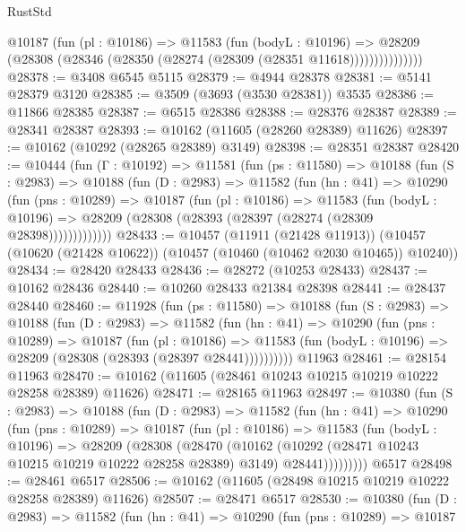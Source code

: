 \begin{lexlean}{RustStd}
\begin{coremodule}
                @10187
                  (fun (pl : @10186) =>
                  @11583
                    (fun (bodyL : @10196) =>
                    @28209 (@28308 (@28346 (@28350 (@28274 (@28309 (@28351 @11618)))))))))))))))
@28378 := @3408 @6545 @5115
@28379 := @4944 @28378
@28381 := @5141 @28379 @3120
@28385 := @3509 (@3693 (@3530 @28381)) @3535
@28386 := @11866 @28385
@28387 := @6515 @28386
@28388 := @28376 @28387
@28389 := @28341 @28387
@28393 := @10162 (@11605 (@28260 @28389) @11626)
@28397 := @10162 (@10292 (@28265 @28389) @3149)
@28398 := @28351 @28387
@28420 := @10444
    (fun (Γ : @10192) =>
    @11581
      (fun (ps : @11580) =>
      @10188
        (fun (S : @2983) =>
        @10188
          (fun (D : @2983) =>
          @11582
            (fun (hn : @41) =>
            @10290
              (fun (pns : @10289) =>
              @10187
                (fun (pl : @10186) =>
                @11583
                  (fun (bodyL : @10196) =>
                  @28209 (@28308 (@28393 (@28397 (@28274 (@28309 @28398)))))))))))))
@28433 := @10457
    (@11911 (@21428 @11913))
    (@10457 (@10620 (@21428 @10622)) (@10457 (@10460 (@10462 @2030 @10465)) @10240))
@28434 := @28420 @28433
@28436 := @28272 (@10253 @28433)
@28437 := @10162 @28436
@28440 := @10260 @28433 @21384 @28398
@28441 := @28437 @28440
@28460 := @11928
    (fun (ps : @11580) =>
    @10188
      (fun (S : @2983) =>
      @10188
        (fun (D : @2983) =>
        @11582
          (fun (hn : @41) =>
          @10290
            (fun (pns : @10289) =>
            @10187
              (fun (pl : @10186) =>
              @11583 (fun (bodyL : @10196) => @28209 (@28308 (@28393 (@28397 @28441))))))))))
    @11963
@28461 := @28154 @11963
@28470 := @10162 (@11605 (@28461 @10243 @10215 @10219 @10222 @28258 @28389) @11626)
@28471 := @28165 @11963
@28497 := @10380
    (fun (S : @2983) =>
    @10188
      (fun (D : @2983) =>
      @11582
        (fun (hn : @41) =>
        @10290
          (fun (pns : @10289) =>
          @10187
            (fun (pl : @10186) =>
            @11583
              (fun (bodyL : @10196) =>
              @28209
                (@28308
                  (@28470
                    (@10162
                      (@10292 (@28471 @10243 @10215 @10219 @10222 @28258 @28389) @3149)
                      @28441)))))))))
    @6517
@28498 := @28461 @6517
@28506 := @10162 (@11605 (@28498 @10215 @10219 @10222 @28258 @28389) @11626)
@28507 := @28471 @6517
@28530 := @10380
    (fun (D : @2983) =>
    @11582
      (fun (hn : @41) =>
      @10290
        (fun (pns : @10289) =>
        @10187

\end{coremodule}
\end{lexlean}

